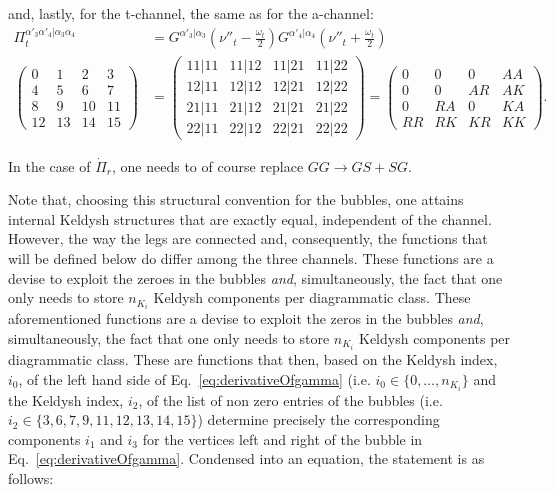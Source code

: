 \documentclass[12pt,a4paper,roman]{article}
\begin{document}
and, lastly, for the t-channel, the same as for the a-channel:
\begin{align}
\Pi_t^{\alpha'_3\alpha'_4|\alpha_3\alpha_4} &= G^{\alpha'_3|\alpha_3}\left(\nu''_t-\frac{\omega_t}{2}\right)G^{\alpha'_4|\alpha_4}\left(\nu''_t+\frac{\omega_t}{2}\right)\\
\begin{pmatrix}
0  & 1  & 2   & 3\\
4  & 5  & 6   & 7\\
8  & 9  & 10 & 11\\
12& 13&14 & 15
\end{pmatrix} &=
\begin{pmatrix}
11|11 & 11|12 & 11|21 & 11|22 \\
12|11 & 12|12 & 12|21 & 12|22\\
21|11 & 21|12 & 21|21 & 21|22\\
22|11 & 22|12 & 22|21 & 22|22
\end{pmatrix} = \begin{pmatrix}
0    & 0    & 0    & AA \\
0    & 0    & AR & AK\\
0    & RA & 0    & KA\\
RR & RK & KR & KK
\end{pmatrix}.
\label{eq:Pit}
\end{align}

In the case of $\dot{\Pi}_r$, one needs to of course replace $GG \rightarrow GS+SG$.

Note that, choosing this structural convention for the bubbles, one attains internal Keldysh structures that are exactly equal, independent of the channel. However, the way the legs are connected and, consequently, the functions that will be defined below do differ among the three channels. These functions are a devise to exploit the zeroes in the bubbles \textit{and}, simultaneously, the fact that one only needs to store $n_{K_i}$ Keldysh components per diagrammatic class.
These aforementioned functions are a devise to exploit the zeros in the bubbles \textit{and}, simultaneously, the fact that one only needs to store $n_{K_i}$ Keldysh components per diagrammatic class. These are functions that then, based on the Keldysh index, $i_0$, of the left hand side of Eq.~\eqref{eq:derivativeOfgamma} (i.e. $i_0\in\{0,\dots, n_{K_i}\}$ and the Keldysh index, $i_2$, of the list of non zero entries of the bubbles (i.e. $i_2\in\{3, 6, 7, 9, 11, 12, 13, 14, 15\}$)  determine precisely the corresponding components $i_1$ and $i_3$ for the vertices left and right of the bubble in Eq.~\eqref{eq:derivativeOfgamma}. Condensed into an equation, the statement is as follows:
\end{document}
